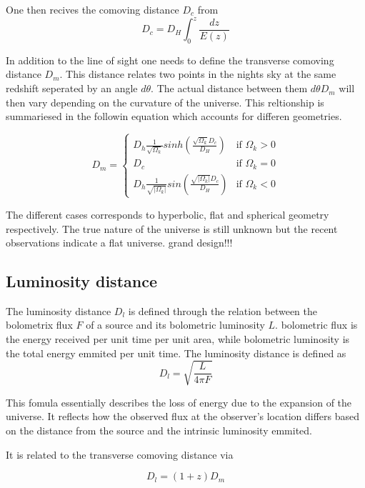 \documentclass{article}
\begin{document}
One then recives the comoving distance $D_c$ from 
\begin{equation}
    D_c =D_H \int_0^z\frac{dz}{E(z)}
\end{equation}

In addition to the line of sight one needs to define the transverse comoving distance $D_m$. This distance 
relates two points in the nights sky at the same redshift seperated by an angle $d\theta$. The actual distance
between them $d\theta D_m$ will then vary depending on the curvature of the universe. This reltionship is summariesed in the followin equation
which accounts for differen geometries.

$$
D_m =
\begin{cases}
  D_h\frac{1}{\sqrt{\Omega_k}}sinh(\frac{\sqrt{\Omega_k}D_c}{D_H}) & \text{if } \Omega_k > 0 \\
  D_c& \text{if } \Omega_k = 0 \\
  D_h\frac{1}{\sqrt{|\Omega_k|}}sin(\frac{\sqrt{|\Omega_k|}D_c}{D_H}) & \text{if } \Omega_k < 0
\end{cases}
$$

The different cases corresponds to hyperbolic, flat and spherical geometry respectively. The true nature 
of the universe is still unknown but the recent observations indicate a flat universe. grand design!!!








\subsection{Luminosity distance}
The luminosity distance $D_l$ is defined through the relation between 
the bolometrix flux $F$ of a source and its bolometric luminosity $L$. bolometric flux is the energy received per unit time per unit area, while bolometric luminosity is the total energy emmited per unit time.
The luminosity distance is defined as
\begin{equation}
    D_l = \sqrt{\frac{L}{4\pi F}}
\end{equation}

This fomula essentially describes the loss of energy due to the expansion of the universe. It reflects how the observed flux at the observer's location differs based on the distance from the source and the intrinsic luminosity emmited. 

It is related to the transverse comoving distance via 

\begin{equation}
    D_l = (1+z)D_m
\end{equation}
\end{document}
